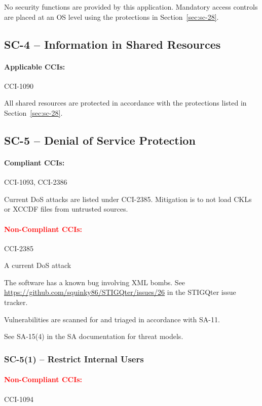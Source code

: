 \documentclass[letterpaper, 10pt, twoside]{article}
\begin{document}
No security functions are provided by this application. Mandatory access controls are placed at an OS level using the protections in Section~\ref{sec:sc-28}.

\subsection{SC-4 -- Information in Shared Resources}

\paragraph{Applicable CCIs:} CCI-1090

All shared resources are protected in accordance with the protections listed in Section~\ref{sec:sc-28}.

\subsection{SC-5 -- Denial of Service Protection}
\label{sec:sc-5}

\paragraph{Compliant CCIs:} CCI-1093, CCI-2386

Current DoS attacks are listed under CCI-2385. Mitigation is to not load CKLs or XCCDF files from untrusted sources.

\paragraph{\textcolor{red}{Non-Compliant CCIs:}} CCI-2385

A current DoS attack

The software has a known bug involving XML bombs. See \href{Issue #26}{https://github.com/squinky86/STIGQter/issues/26} in the STIGQter issue tracker.

Vulnerabilities are scanned for and triaged in accordance with SA-11.

See SA-15(4) in the SA documentation for threat models.

\subsubsection{SC-5(1) -- Restrict Internal Users}

\paragraph{\textcolor{red}{Non-Compliant CCIs:}} CCI-1094
\end{document}
